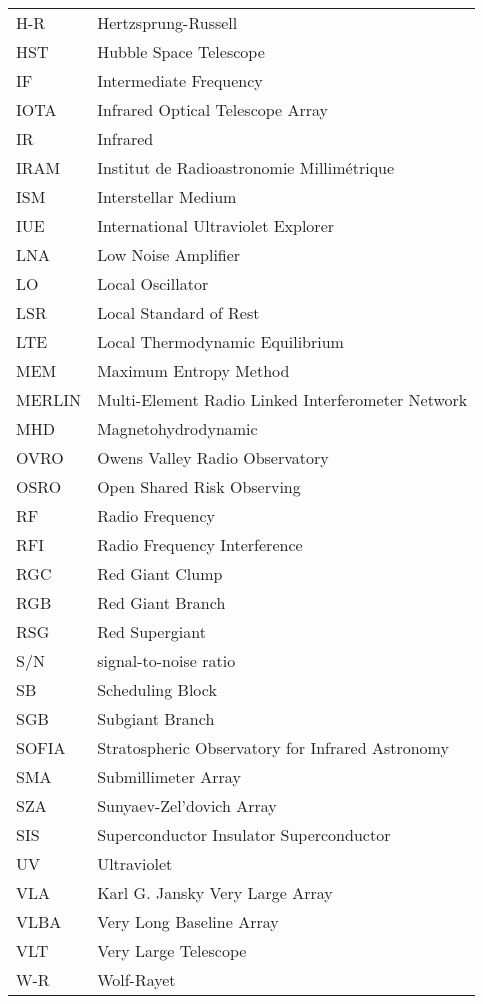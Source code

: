 \begin{center}
\begin{longtable}{ll}
H-R & Hertzsprung-Russell \\
HST & Hubble Space Telescope \\
IF & Intermediate Frequency \\
IOTA & Infrared Optical Telescope Array\\
IR & Infrared \\
IRAM & Institut de Radioastronomie Millim\'etrique \\
ISM & Interstellar Medium \\
IUE & International Ultraviolet Explorer \\
LNA & Low Noise Amplifier \\
LO & Local Oscillator \\
LSR & Local Standard of Rest \\
LTE & Local Thermodynamic Equilibrium \\
MEM & Maximum Entropy Method\\
MERLIN & Multi-Element Radio Linked Interferometer Network\\
MHD & Magnetohydrodynamic \\
OVRO & Owens Valley Radio Observatory \\
OSRO & Open Shared Risk Observing \\
RF & Radio Frequency \\
RFI & Radio Frequency Interference \\
RGC & Red Giant Clump \\
RGB & Red Giant Branch \\
RSG & Red Supergiant \\
S/N & signal-to-noise ratio\\
SB & Scheduling Block \\
SGB & Subgiant Branch \\
SOFIA & Stratospheric Observatory for Infrared Astronomy\\
SMA & Submillimeter Array \\
SZA & Sunyaev-Zel'dovich Array \\
SIS & Superconductor Insulator Superconductor \\
UV & Ultraviolet \\
VLA & Karl G. Jansky Very Large Array \\
VLBA & Very Long Baseline Array \\
VLT & Very Large Telescope \\
W-R & Wolf-Rayet\\
\end{longtable}
\end{center}

